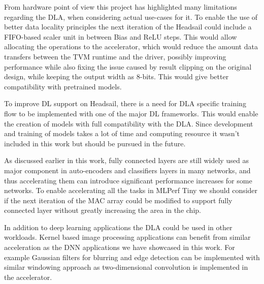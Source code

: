 \documentclass[12pt,a4paper,english
]{tunithesis}
\begin{document}
From hardware point of view this project has highlighted many limitations regarding the DLA, when considering actual use-cases for it. To enable the use of better data locality principles the next iteration of the Headsail could include a FIFO-based scaler unit in between Bias and ReLU steps. This would allow allocating the  operations to the accelerator, which would reduce the amount data transfers between the TVM runtime and the driver, possibly improving performance while also fixing the issue caused by result clipping on the original design, while keeping the output width as 8-bits. This would give better compatibility with pretrained models.

To improve DL support on Headsail, there is a need for DLA specific training flow to be implemented with one of the major DL frameworks. This would enable the creation of models with full compatibility with the DLA. Since development and training of models takes a lot of time and computing resource it wasn't included in this work but should be pursued in the future.

As discussed earlier in this work, fully connected layers are still widely used as major component in auto-encoders and classifiers layers in many networks, and thus accelerating them can introduce significant performance increases for some networks. To enable accelerating all the tasks in MLPerf Tiny we should consider if the next iteration of the MAC array could be modified to support fully connected layer without greatly increasing the area in the chip.

In addition to deep learning applications the DLA could be used in other workloads. Kernel based image processing applications can benefit from similar acceleration as the DNN applications we have showcased in this work. For example Gaussian filters for blurring and edge detection can be implemented with similar windowing approach as two-dimensional convolution is implemented in the accelerator.


%
%
\newpage

\printbibliography[title=References]


%

\appendix
\pagestyle{headings}



%
% 
\def\appA{APPENDIX A. Headsail DLA TVM Backend Codegen Example} %
\end{document}
